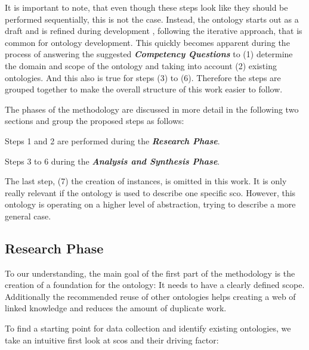 \documentclass[a4paper, DIV=13, BCOR=0cm]{scrbook}
\newcommand{\pn}[1]{\textit{\textbf{#1}}}
\begin{document}
It is important to note, that even though these steps look like they should be performed sequentially, this is not the case. Instead, the ontology starts out as a draft and is refined during development \cite[Section 3, Introduction]{guide-to-ontology}, following the iterative approach, that is common for ontology development. \cite[p.\,158, section 1.5.1]{stuckenschmidt2010ontologien} This quickly becomes apparent during the process of answering the suggested \pn{Competency Questions} to (1) determine the domain and scope of the ontology \cite[Section 3, Step 1]{guide-to-ontology} and taking into account (2) existing ontologies. And this also is true for steps (3) to (6). Therefore the steps are grouped together to make the overall structure of this work easier to follow.

The phases of the methodology are discussed in more detail in the following two sections and group the proposed steps as follows:

\begin{compactenum}
	\item Steps 1 and 2 are performed during the \pn{Research Phase}.
	\item Steps 3 to 6 during the \pn{Analysis and Synthesis Phase}.
\end{compactenum}

The last step, (7) the creation of instances, is omitted in this work. It is only really relevant if the ontology is used to describe one specific \gls{sco}. \cite{CN} However, this ontology is operating on a higher level of abstraction, trying to describe a more general case.

\subsection{Research Phase}
To our understanding, the main goal of the first part of the methodology is the creation of a foundation for the ontology: It needs to have a clearly defined scope. Additionally the recommended reuse of other ontologies helps creating a web of linked knowledge and reduces the amount of duplicate work.

To find a starting point for data collection and identify existing ontologies, we take an intuitive first look at \glspl{sco} and their driving factor:
\end{document}
